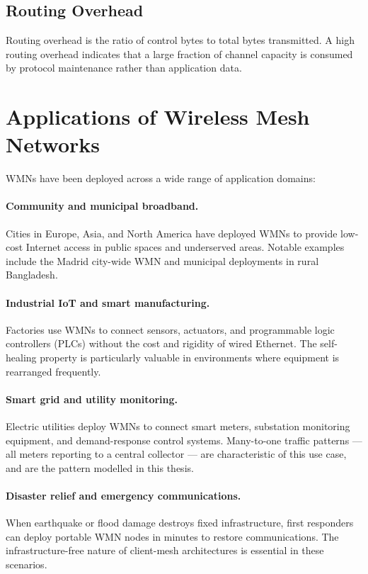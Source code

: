 \subsection{Routing Overhead}

Routing overhead is the ratio of control bytes to total bytes transmitted. A high routing
overhead indicates that a large fraction of channel capacity is consumed by protocol
maintenance rather than application data.

\section{Applications of Wireless Mesh Networks}

WMNs have been deployed across a wide range of application domains:

\paragraph{Community and municipal broadband.}
Cities in Europe, Asia, and North America have deployed WMNs to provide low-cost
Internet access in public spaces and underserved areas. Notable examples include the
Madrid city-wide WMN and municipal deployments in rural Bangladesh.

\paragraph{Industrial IoT and smart manufacturing.}
Factories use WMNs to connect sensors, actuators, and programmable logic controllers
(PLCs) without the cost and rigidity of wired Ethernet. The self-healing property is
particularly valuable in environments where equipment is rearranged frequently.

\paragraph{Smart grid and utility monitoring.}
Electric utilities deploy WMNs to connect smart meters, substation monitoring equipment,
and demand-response control systems. Many-to-one traffic patterns --- all meters reporting
to a central collector --- are characteristic of this use case, and are the pattern
modelled in this thesis.

\paragraph{Disaster relief and emergency communications.}
When earthquake or flood damage destroys fixed infrastructure, first responders can deploy
portable WMN nodes in minutes to restore communications. The infrastructure-free nature
of client-mesh architectures is essential in these scenarios.

